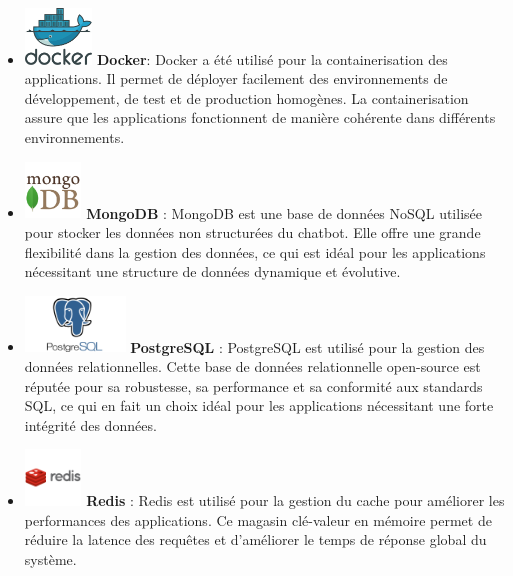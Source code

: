 \documentclass[a4paper, 11pt, openany]{report}
\begin{document}
\begin{itemize}
    \item  \includegraphics[height=1.5cm]{images/docker.png} \hspace{5pt} \textbf{Docker}: 
    Docker a été utilisé pour la containerisation des applications. Il permet de déployer facilement des environnements de développement, de test et de production homogènes. La containerisation assure que les applications fonctionnent de manière cohérente dans différents environnements.

    \item \includegraphics[height=1.5cm]{images/mongo.png} \hspace{5pt} \textbf{MongoDB}  : 
    MongoDB est une base de données NoSQL utilisée pour stocker les données non structurées du chatbot. Elle offre une grande flexibilité dans la gestion des données, ce qui est idéal pour les applications nécessitant une structure de données dynamique et évolutive.

    \item \includegraphics[height=1.5cm]{images/postgres.png} \hspace{5pt} \textbf{PostgreSQL}  : 
    PostgreSQL est utilisé pour la gestion des données relationnelles. Cette base de données relationnelle open-source est réputée pour sa robustesse, sa performance et sa conformité aux standards SQL, ce qui en fait un choix idéal pour les applications nécessitant une forte intégrité des données.

    \item \includegraphics[height=1.5cm]{images/redis.png} \hspace{5pt} \textbf{Redis} : 
    Redis est utilisé pour la gestion du cache pour améliorer les performances des applications. Ce magasin clé-valeur en mémoire permet de réduire la latence des requêtes et d'améliorer le temps de réponse global du système.


\end{itemize}
\end{document}

